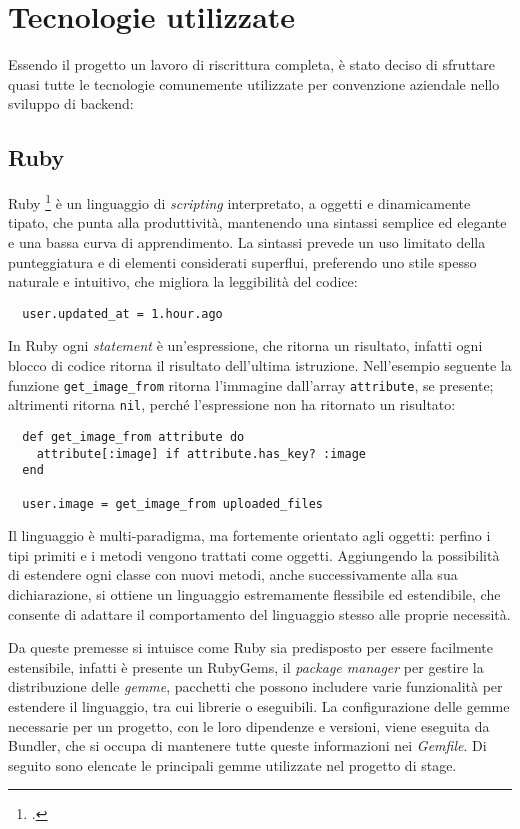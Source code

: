 \section{Tecnologie utilizzate}
Essendo il progetto un lavoro di riscrittura completa, è stato deciso di sfruttare quasi tutte le tecnologie comunemente utilizzate per convenzione aziendale nello sviluppo di backend:

\subsection{Ruby}
Ruby \footcite{site:ruby} è un linguaggio di \emph{scripting} interpretato, a oggetti e dinamicamente tipato, che punta alla produttività, mantenendo una sintassi semplice ed elegante e una bassa curva di apprendimento. La sintassi prevede un uso limitato della punteggiatura e di elementi considerati superflui, preferendo uno stile spesso naturale e intuitivo, che migliora la leggibilità del codice:
\begin{lstlisting}
  user.updated_at = 1.hour.ago
\end{lstlisting}

\noindent In Ruby ogni \emph{statement} è un'espressione, che ritorna un risultato, infatti ogni blocco di codice ritorna il risultato dell'ultima istruzione. Nell'esempio seguente la funzione \verb|get_image_from| ritorna l'immagine dall'array \verb|attribute|, se presente; altrimenti ritorna \verb|nil|, perché l'espressione non ha ritornato un risultato:
\begin{lstlisting}
  def get_image_from attribute do
    attribute[:image] if attribute.has_key? :image
  end

  user.image = get_image_from uploaded_files
\end{lstlisting}

\noindent Il linguaggio è multi-paradigma, ma fortemente orientato agli oggetti: perfino i tipi primiti e i metodi vengono trattati come oggetti. Aggiungendo la possibilità di estendere ogni classe con nuovi metodi, anche successivamente alla sua dichiarazione, si ottiene un linguaggio estremamente flessibile ed estendibile, che consente di adattare il comportamento del linguaggio stesso alle proprie necessità.

Da queste premesse si intuisce come Ruby sia predisposto per essere facilmente estensibile, infatti è presente un RubyGems, il \emph{package manager} per gestire la distribuzione delle \emph{gemme}, pacchetti che possono includere varie funzionalità per estendere il linguaggio, tra cui librerie o eseguibili. La configurazione delle gemme necessarie per un progetto, con le loro dipendenze e versioni, viene eseguita da Bundler, che si occupa di mantenere tutte queste informazioni nei \emph{Gemfile}. Di seguito sono elencate le principali gemme utilizzate nel progetto di stage.
